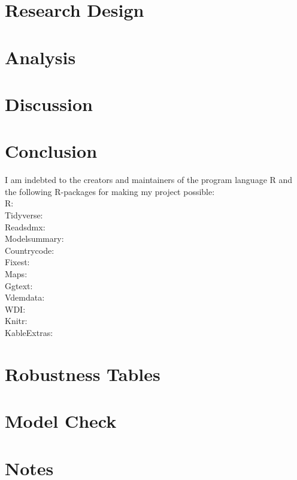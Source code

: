 \documentclass[12pt]{report} %
\begin{document}
\chapter{Research Design} \label{chp:research_design}


\chapter{Analysis} \label{chp:analysis}


\chapter{Discussion}
 \label{chp:discussion}

\chapter{Conclusion}
 \label{chp:conclusion}



\newpage
\thispagestyle{empty}
\vspace*{\fill}
\begin{center}
    I am indebted to the creators and maintainers of the program language R and the following R-packages for making my project possible: \\
    R: \citet{r_core_team_r_2024} \\
    Tidyverse: \citet{wickham_welcome_2019} \\
    Readsdmx: \citet{queljoe_readsdmx_2023} \\
    Modelsummary: \citet{arel-bundock_modelsummary_2022} \\
    Countrycode: \citet{arel-bundock_countrycode_2018} \\
    Fixest: \citet{berge_efficient_2018} \\
    Maps: \citet{becker_maps_2024} \\
    Ggtext: \citet{wilke_ggtext_2022} \\
    Vdemdata: \citet{maerz_vdemdata_2025} \\
    WDI: \citet{arel-bundock_wdi_2022} \\
    Knitr: \citet{xie_knitr_2024, xie_dynamic_2015, stodden_knitr_2014} \\
    KableExtras: \citet{zhu_kableextra_2024} \\
    
\end{center}
\vspace*{\fill}

\newpage

\appendix
\chapter{Robustness Tables} \label{apn:robust}


\chapter{Model Check} \label{apn:model}


\chapter{Notes} \label{apn:notes}

\end{document}
